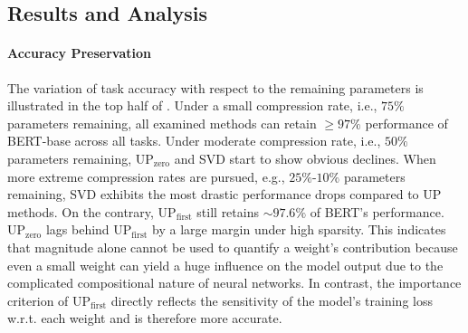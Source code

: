 \subsection{Results and Analysis}
\label{sec:pilot_results}



\paragraph{Accuracy Preservation} 
The variation of task accuracy with respect to the remaining parameters is illustrated 
in the top half of . Under a small compression rate, i.e., 
$75\%$  parameters remaining, all examined methods can retain $\ge 97\%$ performance 
of BERT-base across all tasks. Under moderate compression rate, i.e., $50\%$ parameters remaining, UP$_\text{zero}$ and SVD start to show obvious declines. 
When more extreme compression rates are pursued, e.g., $25\%$-$10\%$ parameters 
remaining, SVD exhibits the most drastic performance drops compared to UP methods. 
On the contrary,  UP$_\text{first}$ still retains $\sim 97.6\%$ of BERT's performance.
UP$_\text{zero}$ lags behind UP$_\text{first}$ by a large margin under high sparsity. This indicates that magnitude alone cannot be used to quantify a weight's 
contribution because even a small weight can yield a huge influence on the model 
output due to the complicated compositional nature of neural networks. 
In contrast, the importance criterion of UP$_\text{first}$ directly reflects the 
sensitivity of the model's training loss w.r.t. each weight and is therefore more 
accurate.

